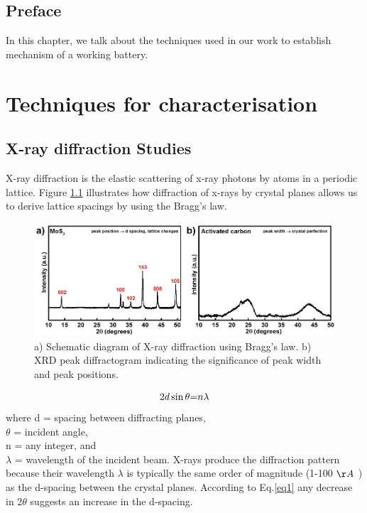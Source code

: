 \section*{Preface}
In this chapter, we talk about the techniques used in our work to establish mechanism of a working battery. 
\pagebreak
\chapter{Techniques for characterisation} %
\label{chap2} %

\section{X-ray diffraction Studies}
X-ray diffraction is the elastic scattering of x-ray photons by atoms in a periodic lattice. Figure \ref{Figures/chap2fig:XRD} illustrates how diffraction of x-rays by crystal planes allows us to derive lattice spacings by using the Bragg's law. 

\begin{figure}[h!]
\centering
\includegraphics[width=\textwidth]{Figures/chap2fig/XRD}
\caption{a) Schematic diagram of X-ray diffraction using Bragg's law. b) XRD peak diffractogram indicating the significance of peak width and peak positions.}
\label{Figures/chap2fig:XRD}
\end{figure}
 \begin{equation} \label{eq1}
     2d\sin\theta \text= n{\lambda}
 \end{equation}
 where d = spacing between diffracting planes,\\
$\theta$ = incident angle,\\ 
n = any integer, and \\
$\lambda$ = wavelength of the incident beam. X-rays produce the diffraction pattern because their wavelength $\lambda$ is typically the same order of magnitude (1-100 $\AA$ ) as the d-spacing between the crystal planes. According to Eq.\ref{eq1} any decrease in 2$\theta$ suggests an increase in the d-spacing. 

